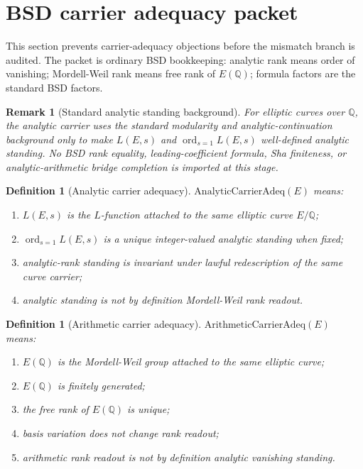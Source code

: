 \documentclass[11pt]{article}
\newtheorem{definition}[theorem]{Definition}
\newtheorem{remark}[theorem]{Remark}
\newcommand{\Q}{\mathbb{Q}}
\newcommand{\ord}{\operatorname{ord}}
\begin{document}
\section{BSD carrier adequacy packet}

This section prevents carrier-adequacy objections before the mismatch branch is audited. The packet is ordinary BSD bookkeeping: analytic rank means order of vanishing; Mordell-Weil rank means free rank of $E(\Q)$; formula factors are the standard BSD factors.


\begin{remark}[Standard analytic standing background]
For elliptic curves over $\Q$, the analytic carrier uses the standard modularity and analytic-continuation background only to make $L(E,s)$ and $\ord_{s=1}L(E,s)$ well-defined analytic standing. No BSD rank equality, leading-coefficient formula, Sha finiteness, or analytic-arithmetic bridge completion is imported at this stage.
\end{remark}

\begin{definition}[Analytic carrier adequacy]
$\mathrm{AnalyticCarrierAdeq}(E)$ means:
\begin{enumerate}[label=(\alph*)]
\item $L(E,s)$ is the $L$-function attached to the same elliptic curve $E/\Q$;
\item $\ord_{s=1}L(E,s)$ is a unique integer-valued analytic standing when fixed;
\item analytic-rank standing is invariant under lawful redescription of the same curve carrier;
\item analytic standing is not by definition Mordell-Weil rank readout.
\end{enumerate}
\end{definition}


\begin{definition}[Arithmetic carrier adequacy]
$\mathrm{ArithmeticCarrierAdeq}(E)$ means:
\begin{enumerate}[label=(\alph*)]
\item $E(\Q)$ is the Mordell-Weil group attached to the same elliptic curve;
\item $E(\Q)$ is finitely generated;
\item the free rank of $E(\Q)$ is unique;
\item basis variation does not change rank readout;
\item arithmetic rank readout is not by definition analytic vanishing standing.
\end{enumerate}
\end{definition}
\end{document}
